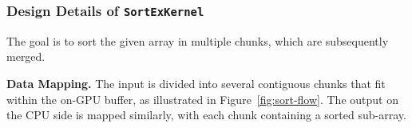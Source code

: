 \begin{comment}
AMD and Nvidia officially maintain highly optimized parallel primitives for their GPUs~\cite{rocprim, cub}.
Besides being widely tested, these libraries keep integrating state-of-the-art techniques~\cite{onesweep-2022, mergepath-2012}, providing competitive performance.
In this work, we use primitives from rocPRIM~\cite{rocprim} as we work on AMD GPUs, whose interface is similar to their counterparts in Nvidia CUB~\cite{cub}.
We briefly discuss the primitives we used from rocPRIM and the input/output convention of these primitives. 

A \textit{double buffer} is a pair of memory regions and one is marked as \texttt{current} while another as \texttt{alternate} by an integer. 
It is the common data structure used by GPU sort primitives.
\texttt{radix\_sort\_key()} takes a double buffer whose \texttt{current} holds the input array.
After sorting, it changes the marker such that \texttt{current} holds the sorted array.
\texttt{radix\_sort\_pair()} takes two double buffers for the pairs' key and value.
Following a similar input/output convention, it outputs the sorted pairs' key and value in the \texttt{current} of each double buffer.
Another primitive we use is \texttt{merge()}.
It takes two pointers to two sorted arrays and another pointer to the output array.
It merges the sorted arrays and fills the output array with the result.
\end{comment}

\subsubsection{\textbf{Design Details of \texttt{SortExKernel}}}
\label{sec:SortExOperation}
The goal is to sort the given array in multiple chunks, which are subsequently merged.

\noindent
\textbf{Data Mapping.}
The input is divided into several contiguous chunks that fit within the on-GPU buffer, as illustrated in Figure~\ref{fig:sort-flow}. 
The output on the CPU side is mapped similarly, with each chunk containing a sorted sub-array.

